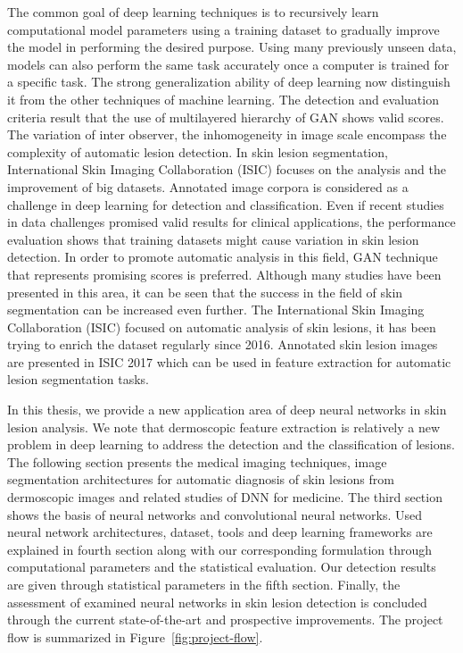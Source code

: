 The common goal of deep learning techniques is to recursively learn computational model parameters using a training dataset to gradually improve the model in performing the desired purpose.
Using many previously unseen data, models can also perform the same task accurately once a computer is trained for a specific task.
The strong generalization ability of deep learning now distinguish it from the other techniques of machine learning.
The detection and evaluation criteria result that the use of multilayered hierarchy of GAN shows valid scores.
The variation of inter observer, the inhomogeneity in image scale encompass the complexity of automatic lesion detection.
In skin lesion segmentation, International Skin Imaging Collaboration (ISIC) focuses on the analysis and the improvement of big datasets.
Annotated image corpora is considered as a challenge in deep learning for detection and classification.
Even if recent studies in data challenges promised valid results for clinical applications, the performance evaluation shows that training datasets might cause variation in skin lesion detection.
In order to promote automatic analysis in this field, GAN technique that represents promising scores is preferred.
Although many studies have been presented in this area, it can be seen that the success in the field of skin segmentation can be increased even further.
The International Skin Imaging Collaboration (ISIC) focused on automatic analysis of skin lesions, it has been trying to enrich the dataset regularly since 2016.
Annotated skin lesion images are presented in ISIC 2017 which can be used in feature extraction for automatic lesion segmentation tasks.



In this thesis, we provide a new application area of deep neural networks in skin lesion analysis.
We note that dermoscopic feature extraction is relatively a new problem in deep learning to address the detection and the classification of lesions.
The following section presents the medical imaging techniques, image segmentation architectures for automatic diagnosis of skin lesions from dermoscopic images and related studies of DNN for medicine.
The third section shows the basis of neural networks and convolutional neural networks.
Used neural network architectures, dataset, tools and deep learning frameworks are explained in fourth section
along with our corresponding formulation through computational parameters and the statistical evaluation.
Our detection results are given through statistical parameters in the fifth section.
Finally, the assessment of examined neural networks in skin lesion detection is concluded through the current state-of-the-art and prospective improvements. The project flow is summarized in Figure~\ref{fig:project-flow}.